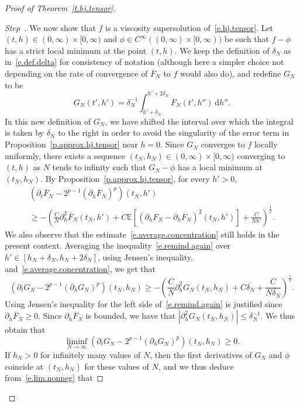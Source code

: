 \documentclass[10pt]{amsart}
\theoremstyle{definition}\newtheorem{defi}[theo]{Definition}\newtheorem{rema}[theo]{Remark}\newtheorem{exam}[theo]{Example}\newtheorem{exem}[theo]{Example}\newtheorem{nota}[theo]{Notation}
\newcommand{\E}{\mathbb{E}}
\renewcommand{\d}{\mathrm{d}}
\newcommand{\1}{\mathds{1}}
\renewcommand{\le}{\leqslant}
\renewcommand{\ge}{\geqslant}
\renewcommand{\bar}{\overline}
\newcommand{\de}{\delta}
\newcounter{stepcount}
\newenvironment{step}{\refstepcounter{stepcount}\begin{proof}[Step~\thestepcount]}{\let\qed\relax\end{proof}}
\begin{document}
\begin{proof}[Proof of Theorem~\ref{t.hj.tensor}]
\label{prooftheo5.1Step2}
\begin{step}
We now show that $f$ is a viscosity supersolution of~\eqref{e.hj.tensor}. Let $(t,h) \in (0,\infty)\times [0,\infty)$ and $\phi \in C^\infty((0,\infty)\times [0,\infty))$ be such that $f-\phi$ has a strict local minimum at the point $(t,h)$. We keep the definition of $\de_N$ as in~\eqref{e.def.delta} for consistency of notation (although here a simpler choice not depending on the rate of convergence of $\bar F_N$ to $f$ would also do), and redefine $G_N$ to be
\[
G_N\left(t',h'\right) = \de_N^{-1} \int_{h'+\de_N}^{h'+2\de_N} \bar F_N\left(t',h''\right) \, \d h''.
\]
In this new definition of $G_N$, we have shifted the interval over which the integral is taken by $\de_N$ to the right in order to avoid the singularity of the error term in Proposition~\ref{p.approx.hj.tensor} near $h = 0$. Since $G_N$ converges to $f$ locally uniformly, there exists a sequence $(t_N,h_N) \in (0,\infty)\times [0,\infty)$ converging to $(t,h)$ as $N$ tends to infinity such that $G_N - \phi$ has a local minimum at $(t_N,h_N)$. By Proposition~\ref{p.approx.hj.tensor}, for every $h' > 0$,
\begin{multline}\label{e.remind.again}
\left(\partial_t \bar F_N - 2^{p-1} \left(\partial_h \bar F_N\right)^p \right)(t_N,h')
\\
\ge -\left(\frac C {N} \partial_{h}^2 \bar F_N\left(t_N,h'\right) + C \E \left[\left(\partial_h F_N - \partial_h \bar F_N\right)^2\left(t_N,h'\right) \right] +\frac{C}{Nh'}\right)^\frac 1 2.
\end{multline}
We also observe that the estimate~\eqref{e.average.concentration} still holds in the present context. Averaging the inequality~\eqref{e.remind.again} over $h' \in [h_N + \de_N,h_N + 2\de_N]$, using Jensen's inequality, and~\eqref{e.average.concentration}, we get that
\[
\left(\partial_t G_N - 2^{p-1} \left(\partial_h G_N\right)^p \right)(t_N,h_N)
\ge -\left(\frac C {N} \partial_{h}^2 G_N(t_N,h_N) + C \de_N +\frac{C}{N\de_N}\right)^\frac 1 2.
\]
Using Jensen's inequality for the left side of~\eqref{e.remind.again} is justified since $\partial_h \bar F_N \ge 0$. Since $\partial_h \bar F_N$ is bounded, we have that $\left|\partial_h^2 G_N(t_N,h_N)\right| \le \de_N^{-1}$. We thus obtain that
\begin{equation}\label{e.lim.nonneg}
\liminf_{N\to \infty} \left(\partial_t G_N - 2^{p-1} (\partial_h G_N)^p \right)(t_N,h_N) \ge 0.
\end{equation}
If $h_N > 0$ for infinitely many values of $N$, then the first derivatives of $G_N$ and $\phi$ coincide at $(t_N,h_N)$ for these values of $N$, and we thus deduce from~\eqref{e.lim.nonneg} that

\end{step}
\end{proof}
\end{document}
